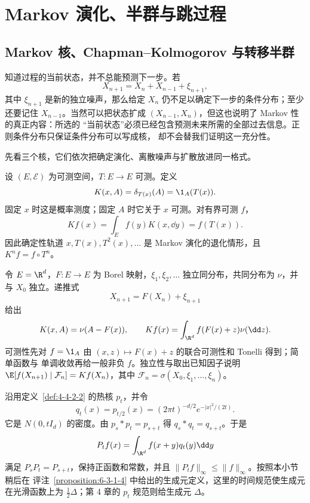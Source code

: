 \section{Markov 演化、半群与跳过程}\label{sec:06-03}

\subsection{Markov 核、Chapman--Kolmogorov 与转移半群}\label{subsec:6-3-1}

知道过程的当前状态，并不总能预测下一步。若
\[
 X_{n+1}=X_n+X_{n-1}+\xi_{n+1},
\]
其中 $\xi_{n+1}$ 是新的独立噪声，那么给定 $X_n$ 仍不足以确定下一步的条件分布；至少还要记住
$X_{n-1}$。当然可以把状态扩成 $(X_{n-1},X_n)$，但这也说明了 Markov 性的真正内容：所选的
“当前状态”必须已经包含预测未来所需的全部过去信息。正则条件分布只保证条件分布可以写成核，
却不会替我们证明这一充分性。

先看三个核，它们依次把确定演化、离散噪声与扩散放进同一格式。

\begin{example}[确定性动力系统]\label{ex:6-3-1-1}
设 $(E,\mathcal E)$ 为可测空间，$T:E\to E$ 可测。定义
\[
 K(x,A)=\delta_{T(x)}(A)=\1_A(T(x)).
\]
固定 $x$ 时这是概率测度；固定 $A$ 时它关于 $x$ 可测。对有界可测 $f$，
\[
 Kf(x)=\int_E f(y)K(x,\dd y)=f(T(x)).
\]
因此确定性轨道 $x,T(x),T^2(x),\ldots$ 是 Markov 演化的退化情形，且
$K^nf=f\circ T^n$。
\end{example}

\begin{example}[加性噪声]\label{ex:6-3-1-2}
令 $E=\R^d$，$F:E\to E$ 为 Borel 映射，$\xi_1,\xi_2,\ldots$ 独立同分布，共同分布为
$\nu$，并与 $X_0$ 独立。递推式
\[
 X_{n+1}=F(X_n)+\xi_{n+1}
\]
给出
\[
 K(x,A)=\nu(A-F(x)),\qquad
 Kf(x)=\int_{\R^d}f(F(x)+z)\nu(\dd z).
\]
可测性先对 $f=\1_A$ 由 $(x,z)\mapsto F(x)+z$ 的联合可测性和 Tonelli 得到；简单函数与
单调收敛再给一般非负 $f$。独立性与取出已知因子说明
$\E[f(X_{n+1})\mid\mathcal F_n]=Kf(X_n)$，其中
$\mathcal F_n=\sigma(X_0,\xi_1,\ldots,\xi_n)$。
\end{example}

\begin{example}[Gaussian 热核]\label{ex:6-3-1-3}
沿用定义~\ref{def:4-4-2-2} 的热核 $p_t$，并令
\[
 q_t(x)=p_{t/2}(x)=(2\pi t)^{-d/2}e^{-|x|^2/(2t)}.
\]
它是 $N(0,tI_d)$ 的密度。由
$p_s*p_t=p_{s+t}$ 得 $q_s*q_t=q_{s+t}$。于是
\[
 P_tf(x)=\int_{\R^d}f(x+y)q_t(y)\dd y
\]
满足 $P_sP_t=P_{s+t}$，保持正函数和常数，并且
$\|P_tf\|_\infty\leq\|f\|_\infty$。按照本小节稍后在
评注~\ref{proposition:6-3-1-4} 中给出的生成元定义，这里的时间规范使生成元在光滑函数上为
$\tfrac12\Delta$；第 4 章的 $p_t$ 规范则给生成元 $\Delta$。
\end{example}

